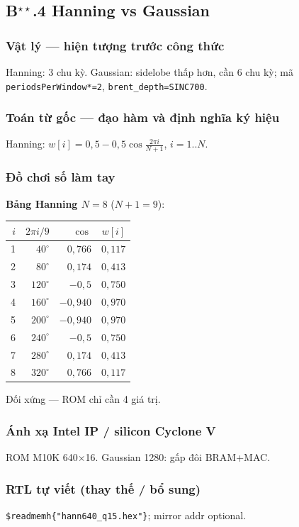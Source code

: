 \subsection*{B$^{\star\star}$.4 Hanning vs Gaussian}
\subsubsection*{Vật lý --- hiện tượng trước công thức}
Hanning: 3 chu kỳ. Gaussian: sidelobe thấp hơn, cần 6 chu kỳ; mã \texttt{periodsPerWindow*=2}, \texttt{brent\_depth=SINC700}.
\subsubsection*{Toán từ gốc --- đạo hàm và định nghĩa ký hiệu}
Hanning: $w[i]=0{,}5-0{,}5\cos\frac{2\pi i}{N+1}$, $i=1..N$.
\subsubsection*{Đồ chơi số làm tay}
\textbf{Bảng Hanning $N=8$} ($N+1=9$):
\begin{center}
\small
\begin{tabular}{@{}rrrr@{}}
\toprule
$i$ & $2\pi i/9$ & $\cos$ & $w[i]$ \\
\midrule
1 & $40^\circ$ & $0{,}766$ & $0{,}117$ \\
2 & $80^\circ$ & $0{,}174$ & $0{,}413$ \\
3 & $120^\circ$ & $-0{,}5$ & $0{,}750$ \\
4 & $160^\circ$ & $-0{,}940$ & $0{,}970$ \\
5 & $200^\circ$ & $-0{,}940$ & $0{,}970$ \\
6 & $240^\circ$ & $-0{,}5$ & $0{,}750$ \\
7 & $280^\circ$ & $0{,}174$ & $0{,}413$ \\
8 & $320^\circ$ & $0{,}766$ & $0{,}117$ \\
\bottomrule
\end{tabular}
\end{center}
Đối xứng --- ROM chỉ cần 4 giá trị.
\subsubsection*{Ánh xạ Intel IP / silicon Cyclone V}
ROM M10K 640$\times$16. Gaussian 1280: gấp đôi BRAM+MAC.
\subsubsection*{RTL tự viết (thay thế / bổ sung)}
\texttt{\$readmemh\{"hann640\_q15.hex"\}}; mirror addr optional.
